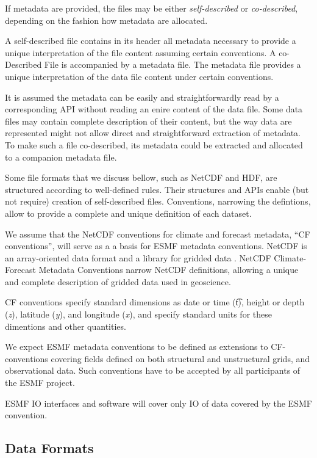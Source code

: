 If metadata are provided, the files may be either {\em self-described} or
{\em co-described}, depending on the fashion how metadata are allocated.

A self-described file contains in its header all metadata necessary to 
provide a unique interpretation of the file content assuming certain 
conventions.  A co-Described File is accompanied by a metadata file. The
metadata file provides a unique interpretation of the data file content
under certain conventions. 

It is assumed the metadata can be easily and straightforwardly read by a 
corresponding API without reading an enire content of the data file. Some 
data files may contain complete description of their content, but the way 
data are represented might not allow direct and straightforward extraction of 
metadata. To make such a file co-described, its metadata could be extracted 
and allocated to a companion metadata file.

Some file formats that we discuss bellow, such as NetCDF and HDF, are 
structured according to well-defined rules. Their structures and APIs enable 
(but not require) creation of self-described files. Conventions, narrowing 
the defintions, allow to provide a complete and unique definition of each 
dataset.

We assume that the NetCDF conventions for climate and forecast metadata, 
``CF conventions'', will serve as a a basis for ESMF metadata conventions.
NetCDF is an array-oriented data format and a library for gridded data 
\cite{NetCDF3_UsersGuide_C}. NetCDF Climate-Forecast Metadata Conventions
\cite{NetCDF_CF_v1_beta3} narrow NetCDF definitions, allowing a unique and 
complete description of gridded data used in geoscience. 

CF conventions specify standard dimensions as date or time ({\t t}), height 
or depth ({\it z}), latitude ({\it y}), and longitude ({\it x}), and specify 
standard units for these dimentions and other quantities. 

We expect ESMF metadata conventions to be defined as extensions to
CF-conventions covering fields defined on both structural and unstructural 
grids, and observational data. Such conventions have to be accepted by all 
participants of the ESMF project.

ESMF I\/O interfaces and software will cover only I\/O of data covered by
the ESMF convention.




\subsection{Data Formats}



